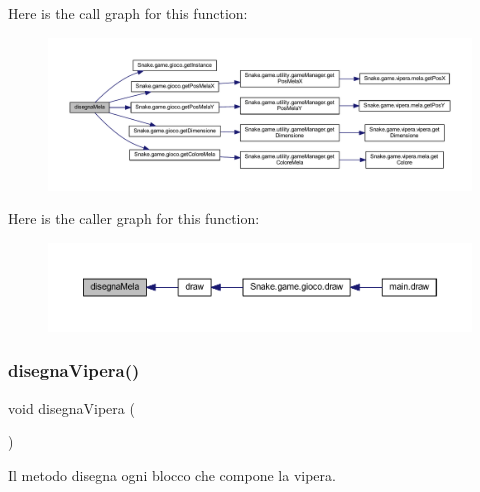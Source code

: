 Here is the call graph for this function\+:
\nopagebreak
\begin{figure}[H]
\begin{center}
\leavevmode
\includegraphics[width=350pt]{class_snake_1_1gui_1_1_manager_g_u_i_a438db0a39d5c05d1dc557b2927726ef7_cgraph}
\end{center}
\end{figure}
Here is the caller graph for this function\+:
\nopagebreak
\begin{figure}[H]
\begin{center}
\leavevmode
\includegraphics[width=350pt]{class_snake_1_1gui_1_1_manager_g_u_i_a438db0a39d5c05d1dc557b2927726ef7_icgraph}
\end{center}
\end{figure}
\mbox{\label{class_snake_1_1gui_1_1_manager_g_u_i_a0e0d67c4f526a64346a8b90e7c9d673d}} 
\subsubsection{\texorpdfstring{disegna\+Vipera()}{disegnaVipera()}}
{\footnotesize\ttfamily void disegna\+Vipera (\begin{DoxyParamCaption}{ }\end{DoxyParamCaption})\hspace{0.3cm}{\ttfamily [private]}}



Il metodo disegna ogni blocco che compone la vipera. 

